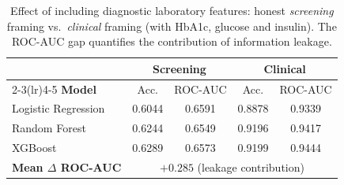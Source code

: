 \begin{table}[!t]
\renewcommand{\arraystretch}{1.2}
\caption{Effect of including diagnostic laboratory features: honest
\emph{screening} framing vs.\ \emph{clinical} framing (with HbA1c, glucose and
insulin). The ROC-AUC gap quantifies the contribution of information leakage.}
\label{tab:framing}
\centering
\begin{tabular}{l c c c c}
\toprule
& \multicolumn{2}{c}{\textbf{Screening}} & \multicolumn{2}{c}{\textbf{Clinical}} \\
\cmidrule(lr){2-3}\cmidrule(lr){4-5}
\textbf{Model} & Acc. & ROC-AUC & Acc. & ROC-AUC \\
\midrule
Logistic Regression & 0.6044 & 0.6591 & 0.8878 & 0.9339 \\
Random Forest       & 0.6244 & 0.6549 & 0.9196 & 0.9417 \\
XGBoost             & 0.6289 & 0.6573 & 0.9199 & 0.9444 \\
\midrule
\multicolumn{1}{l}{\textbf{Mean $\Delta$ ROC-AUC}} & \multicolumn{4}{c}{$+0.285$ (leakage contribution)} \\
\bottomrule
\end{tabular}
\end{table}
